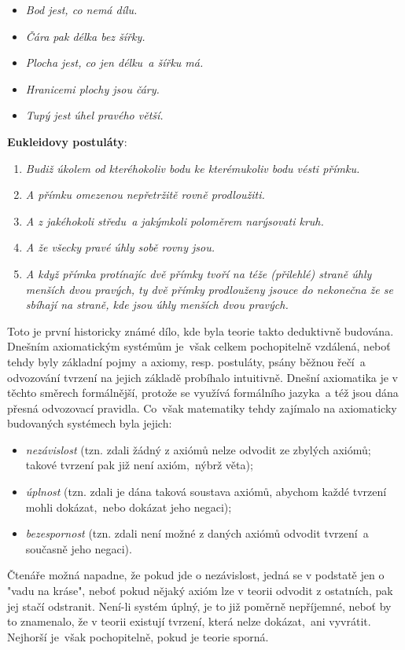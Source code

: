 \begin{itemize}
\item \textit{Bod jest, co nemá dílu.}
\item \textit{Čára pak délka bez šířky.}
\item \textit{Plocha jest, co jen délku~a šířku má.}
\item \textit{Hranicemi plochy jsou čáry.}
\item \textit{Tupý jest úhel pravého větší.}
\end{itemize}
\noindent \textbf{Eukleidovy postuláty}:
\begin{enumerate}[label=({E}\arabic*)]
\item \textit{Budiž úkolem od kteréhokoliv bodu ke kterémukoliv bodu vésti přímku.}
\item \textit{A přímku omezenou nepřetržitě rovně prodloužiti.}
\item \textit{A z jakéhokoli středu~a jakýmkoli poloměrem narýsovati kruh.}
\item \textit{A že všecky pravé úhly sobě rovny jsou.}
\item \textit{A když přímka protínajíc dvě přímky tvoří na téže (přilehlé) straně úhly menších dvou pravých, ty dvě přímky prodlouženy jsouce do nekonečna že se sbíhají na straně, kde jsou úhly menších dvou pravých.}
\end{enumerate}
Toto je první historicky známé dílo, kde byla teorie takto deduktivně budována. Dnešním axiomatickým systémům je~však celkem pochopitelně vzdálená, neboť tehdy byly základní pojmy~a axiomy, resp. postuláty, psány běžnou řečí~a odvozování tvrzení na jejich základě probíhalo intuitivně. Dnešní axiomatika je v těchto směrech formálnější, protože se využívá formálního jazyka~a též jsou dána přesná odvozovací pravidla. Co~však matematiky tehdy zajímalo na axiomaticky budovaných systémech byla jejich:
\begin{itemize}
\item \emph{nezávislost} (tzn. zdali žádný z axiómů nelze odvodit ze zbylých axiómů; takové tvrzení pak již není axióm,~nýbrž věta);
\item \emph{úplnost} (tzn. zdali je dána taková soustava axiómů, abychom každé tvrzení mohli dokázat,~nebo dokázat jeho negaci);
\item \emph{bezespornost} (tzn. zdali není možné z daných axiómů odvodit tvrzení~a současně jeho negaci).
\end{itemize}
Čtenáře možná napadne, že pokud jde o nezávislost, jedná se v podstatě jen o "vadu na kráse", neboť pokud nějaký axióm lze v teorii odvodit z ostatních, pak jej stačí odstranit. Není-li systém úplný, je to již poměrně nepříjemné, neboť by to znamenalo, že v teorii existují tvrzení, která nelze dokázat,~ani vyvrátit. Nejhorší je~však pochopitelně, pokud je teorie sporná.

